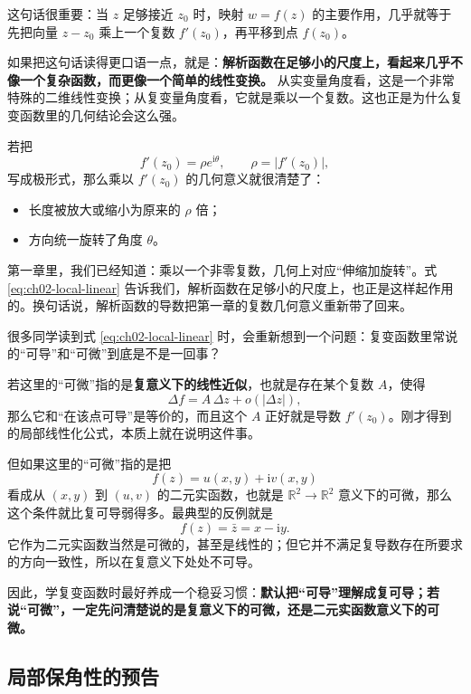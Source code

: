 这句话很重要：当 $z$ 足够接近 $z_0$ 时，映射 $w=f(z)$ 的主要作用，几乎就等于先把向量 $z-z_0$ 乘上一个复数 $f'(z_0)$，再平移到点 $f(z_0)$。

如果把这句话读得更口语一点，就是：\textbf{解析函数在足够小的尺度上，看起来几乎不像一个复杂函数，而更像一个简单的线性变换。} 从实变量角度看，这是一个非常特殊的二维线性变换；从复变量角度看，它就是乘以一个复数。这也正是为什么复变函数里的几何结论会这么强。

若把
\[
    f'(z_0)=\rho e^{\mathrm{i}\theta},\qquad \rho=|f'(z_0)|,
\]
写成极形式，那么乘以 $f'(z_0)$ 的几何意义就很清楚了：
\begin{itemize}
    \item 长度被放大或缩小为原来的 $\rho$ 倍；
    \item 方向统一旋转了角度 $\theta$。
\end{itemize}

\begin{tishi}[这里和第一章的联系]
第一章里，我们已经知道：乘以一个非零复数，几何上对应``伸缩加旋转''。式 \eqref{eq:ch02-local-linear} 告诉我们，解析函数在足够小的尺度上，也正是这样起作用的。换句话说，解析函数的导数把第一章的复数几何意义重新带了回来。
\end{tishi}

\begin{tishi}[现在再回头区分``可导''和``可微'']
很多同学读到式 \eqref{eq:ch02-local-linear} 时，会重新想到一个问题：复变函数里常说的``可导''和``可微''到底是不是一回事？

若这里的``可微''指的是\textbf{复意义下的线性近似}，也就是存在某个复数 $A$，使得
\[
    \Delta f=A\,\Delta z+o(|\Delta z|),
\]
那么它和``在该点可导''是等价的，而且这个 $A$ 正好就是导数 $f'(z_0)$。刚才得到的局部线性化公式，本质上就在说明这件事。

但如果这里的``可微''指的是把
\[
    f(z)=u(x,y)+\mathrm{i}v(x,y)
\]
看成从 $(x,y)$ 到 $(u,v)$ 的二元实函数，也就是 $\mathbb{R}^2\to\mathbb{R}^2$ 意义下的可微，那么这个条件就比复可导弱得多。最典型的反例就是
\[
    f(z)=\bar z=x-\mathrm{i}y.
\]
它作为二元实函数当然是可微的，甚至是线性的；但它并不满足复导数存在所要求的方向一致性，所以在复意义下处处不可导。

因此，学复变函数时最好养成一个稳妥习惯：\textbf{默认把``可导''理解成复可导；若说``可微''，一定先问清楚说的是复意义下的可微，还是二元实函数意义下的可微。}
\end{tishi}

\subsection{局部保角性的预告}

